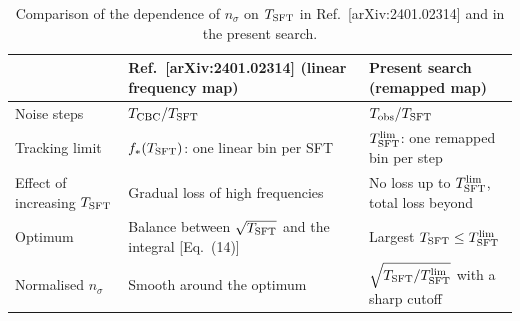 \documentclass[11pt]{article}
\newcommand{\Tsft}{T_{\rm SFT}}
\newcommand{\Tlim}{T_{\rm SFT}^{\rm lim}}
\begin{document}
\begin{table}[h]
  \centering
  \renewcommand{\arraystretch}{1.3}
  \begin{tabular}{>{\raggedright}p{} >{\raggedright}p{} >{\raggedright\arraybackslash}p{}}
    \toprule
     & Ref.~[arXiv:2401.02314] (linear frequency map) & Present search (remapped map) \\
    \midrule
    Noise steps & $T_{\rm CBC}/\Tsft$ & $T_{\rm obs}/\Tsft$ \\
    Tracking limit & $f_\ast(\Tsft)$: one linear bin per SFT & $\Tlim$: one remapped bin per step \\
    Effect of increasing $\Tsft$ & Gradual loss of high frequencies & No loss up to $\Tlim$, total loss beyond \\
    Optimum & Balance between $\sqrt{\Tsft}$ and the integral [Eq.~(14)] & Largest $\Tsft \le \Tlim$ \\
    Normalised $n_\sigma$ & Smooth around the optimum & $\sqrt{\Tsft/\Tlim}$ with a sharp cutoff \\
    \bottomrule
  \end{tabular}
  \caption{Comparison of the dependence of $n_\sigma$ on $\Tsft$ in
    Ref.~[arXiv:2401.02314] and in the present search.}
  \label{tab:comparison}
\end{table}
\end{document}
